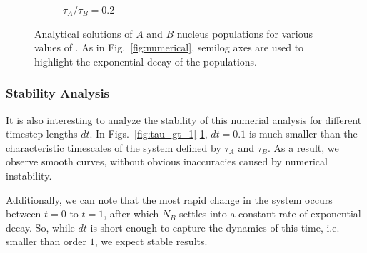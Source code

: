 \documentclass[pra,twocolumn,showpacs,amsmath,amssymb]{revtex4-1}
\begin{document}
\begin{figure}
\begin{subfigure}{.7\linewidth}
    \caption{$\tau_A / \tau_B=0.2$}
    \label{fig:tau_lt_1}
  \end{subfigure}

  \caption{Analytical solutions of $A$ and $B$ nucleus populations for various values of \trel.
  As in Fig.~\ref{fig:numerical}, semilog axes are used to highlight the
  exponential decay of the populations.}
  \label{fig:analytical}
\end{figure}

\subsubsection{Stability Analysis}\label{sec:stability}

It is also interesting to analyze the stability of this numerial analysis for
different timestep lengths $dt$. In Figs.~\ref{fig:tau_gt_1}-\ref{fig:tau_lt_1},
$dt=0.1$ is much smaller than the characteristic timescales of the system defined
by $\tau_A$ and $\tau_B$. As a result, we observe smooth curves, without obvious
inaccuracies caused by numerical instability.

Additionally, we can note that the most rapid change in the system occurs between
$t=0$ to $t=1$, after which $N_B$ settles into a constant
rate of exponential decay. So, while $dt$ is short enough to capture the dynamics
of this time, i.e. smaller than order $1$, we expect stable results.
\end{document}
